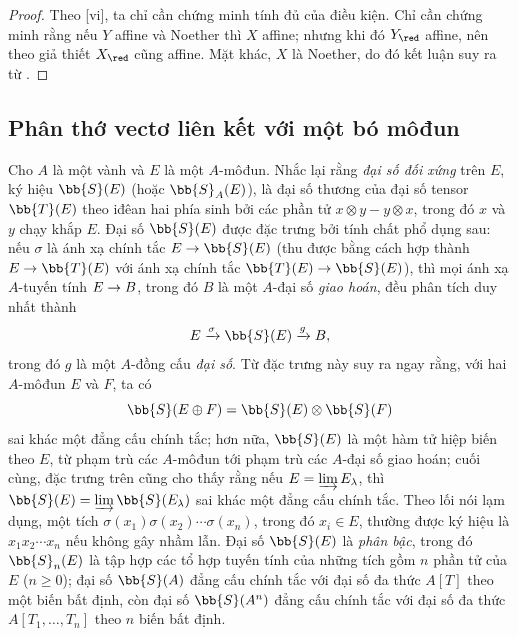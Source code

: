 \documentclass[oneside,10pt]{amsart}
\makeatletter
\renewcommand{\geq}{\geqslant}
\newcommand{\ega@arrow}[2]{\mathchoice{#1}{#2}{#2}{#2}}
\renewcommand{\to}{\ega@arrow{\longrightarrow}{\rightarrow}}
\newcommand{\oldpage}[2][]{\marginnote{\normalfont\footnotesize\textbf{#1}~|~#2}\ignorespaces}
\let\EGAOriginalLabel\label
\renewcommand{\label}[1]{\phantomsection\EGAOriginalLabel{#1}}
\makeatother
\begin{document}
\begin{proof}
Theo [vi], ta chỉ cần chứng minh tính đủ của điều kiện.
Chỉ cần chứng minh rằng nếu $Y$ affine và Noether thì $X$ affine; nhưng khi đó $Y_\red$ affine, nên theo giả thiết $X_\red$ cũng affine.
Mặt khác, $X$ là Noether, do đó kết luận suy ra từ .
\end{proof}

\subsection{Phân thớ vectơ liên kết với một bó môđun}
\label{subsection:II.1.7}

\begin{env}[1.7.1]
\label{II.1.7.1}
Cho $A$ là một vành và $E$ là một $A$-môđun.
Nhắc lại rằng \emph{đại số đối xứng} trên $E$, ký hiệu $\bb{S}(E)$ (hoặc $\bb{S}_A(E)$), là đại số thương của đại số tensor $\bb{T}(E)$ theo iđêan hai phía sinh bởi các phần tử $x\otimes y-y\otimes x$, trong đó $x$ và $y$ chạy khắp $E$.
Đại số $\bb{S}(E)$ được đặc trưng bởi tính chất phổ dụng sau: nếu $\sigma$ là ánh xạ chính tắc $E\to\bb{S}(E)$ (thu được bằng cách hợp thành $E\to\bb{T}(E)$ với ánh xạ chính tắc $\bb{T}(E)\to\bb{S}(E)$), thì mọi ánh xạ $A$-tuyến tính $E\to B$, trong đó $B$ là một $A$-đại số \emph{giao hoán}, đều phân tích duy nhất thành
\[
  E\xrightarrow{\sigma}\bb{S}(E)\xrightarrow{g}B,
\]
trong đó $g$ là một $A$-đồng cấu \emph{đại số}.
Từ đặc trưng này suy ra ngay rằng, với hai $A$-môđun $E$ và $F$, ta có
\[
  \bb{S}(E\oplus F)=\bb{S}(E)\otimes\bb{S}(F)
\]
\oldpage[II]{15}
sai khác một đẳng cấu chính tắc; hơn nữa, $\bb{S}(E)$ là một hàm tử hiệp biến theo $E$, từ phạm trù các $A$-môđun tới phạm trù các $A$-đại số giao hoán; cuối cùng, đặc trưng trên cũng cho thấy rằng nếu $E=\varinjlim E_\lambda$, thì $\bb{S}(E)=\varinjlim\bb{S}(E_\lambda)$ sai khác một đẳng cấu chính tắc.
Theo lối nói lạm dụng, một tích $\sigma(x_1)\sigma(x_2)\cdots\sigma(x_n)$, trong đó $x_i\in E$, thường được ký hiệu là $x_1x_2\cdots x_n$ nếu không gây nhầm lẫn.
Đại số $\bb{S}(E)$ là \emph{phân bậc}, trong đó $\bb{S}_n(E)$ là tập hợp các tổ hợp tuyến tính của những tích gồm $n$ phần tử của $E$ ($n\geq0$); đại số $\bb{S}(A)$ đẳng cấu chính tắc với đại số đa thức $A[T]$ theo một biến bất định, còn đại số $\bb{S}(A^n)$ đẳng cấu chính tắc với đại số đa thức $A[T_1,\dots,T_n]$ theo $n$ biến bất định.
\end{env}
\end{document}
